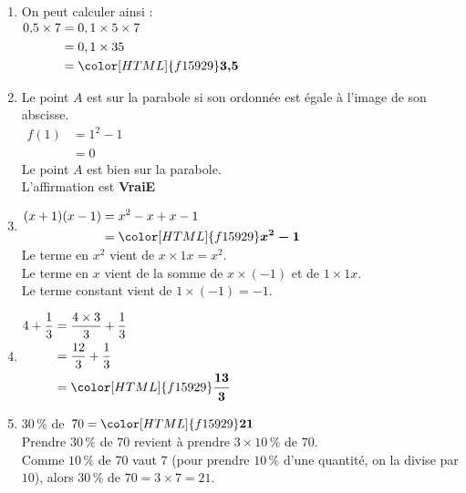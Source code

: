 \documentclass[a4paper,11pt,landscape,exos]{nsi} %
\begin{document}
\begin{multicols}{2}
\maketitle

\begin{enumerate}[itemsep=1em]
    \item On peut calculer ainsi : \\
        $\begin{aligned}
        0{,}5\times7&=0,1\times 5\times7\\
        &=0,1\times 35\\
        &={\color[HTML]{f15929}\boldsymbol{3{,}5}}
        \end{aligned}$
    \item Le point $A$ est sur la parabole si son ordonnée est égale à l'image de son abscisse. \\
        $\begin{aligned}
            f(1)&=1^2-1\\
            &=0
            \end{aligned}$
            \\
            Le point $A$ est bien sur la parabole.\\ L'affirmation est {\bfseries \color[HTML]{f15929}VraiE}
    \item $\begin{aligned}
          (x+1)(x-1)&=x^2-x+x-1\\
          &={\color[HTML]{f15929}\boldsymbol{x^2-1}}
          \end{aligned}$\\Le terme en $x^2$ vient de $x\times 1x=x^2$.\\Le terme en $x$ vient de la somme de $x \times (-1)$ et de $1 \times 1x$.\\Le terme constant vient de $1\times (-1)= -1$.
    \item $\begin{aligned}
          4+\dfrac{1}{3} &= \dfrac{4 \times 3}{3} + \dfrac{1}{3} \\
          &= \dfrac{12}{3} + \dfrac{1}{3}\\
          &  ={\color[HTML]{f15929}\boldsymbol{\dfrac{13}{3}}}
          \end{aligned}$
    \item $30\,\%$ de $70 = {\color[HTML]{f15929}\boldsymbol{21}}$\\ Prendre $30\,\%$  de $70$ revient à prendre $3\times 10\,\%$  de $70$.\\
          Comme $10\,\%$  de $70$ vaut $7$ (pour prendre $10\,\%$  d'une quantité, on la divise par $10$), alors
          $30\,\%$ de $70=3\times 7=21$.
         

\end{enumerate}
\end{multicols}
\end{document}

